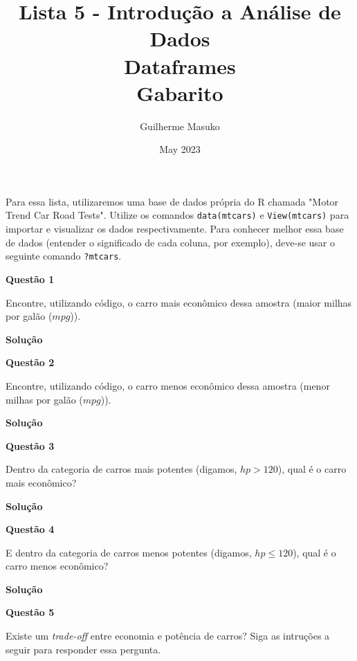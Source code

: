 \documentclass[12pt, a4paper]{article}
\title{Lista 5 - Introdução a Análise de Dados \\
	Dataframes \\
	Gabarito}
\author{Guilherme Masuko}
\date{May 2023}
\begin{document}
	
\clearpage
\maketitle
\thispagestyle{empty}


Para essa lista, utilizaremos uma base de dados própria do R chamada "Motor Trend Car Road Tests". Utilize os comandos \texttt{data(mtcars)} e \texttt{View(mtcars)} para importar e visualizar os dados respectivamente. Para conhecer melhor essa base de dados (entender o significado de cada coluna, por exemplo), deve-se usar o seguinte comando \texttt{?mtcars}.

\textbf{Questão 1}

Encontre, utilizando código, o carro mais econômico dessa amostra (maior milhas por galão ($mpg$)).

\textbf{Solução}





\textbf{Questão 2}

Encontre, utilizando código, o carro menos econômico dessa amostra (menor milhas por galão ($mpg$)).

\textbf{Solução}





\textbf{Questão 3}

Dentro da categoria de carros mais potentes (digamos, $hp > 120$), qual é o carro mais econômico?

\textbf{Solução}





\textbf{Questão 4}

E dentro da categoria de carros menos potentes (digamos, $hp \leq 120$), qual é o carro menos econômico?

\textbf{Solução}





\textbf{Questão 5}

Existe um \textit{trade-off} entre economia e potência de carros? Siga as intruções a seguir para responder essa pergunta.
\end{document}
